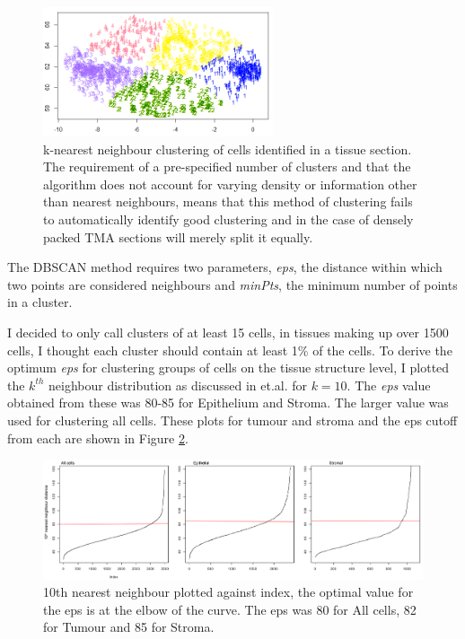 \begin{figure}
    \centering
    \includegraphics{Chapter3/Figs/knn_example_2.png}
    \caption[k-nearest neighbour clustering of cells]{k-nearest neighbour clustering of cells identified in a tissue section. The requirement of a pre-specified number of clusters and that the algorithm does not account for varying density or information other than nearest neighbours, means that this method of clustering fails to automatically identify good clustering and in the case of densely packed TMA sections will merely split it equally.}
    \label{fig:clust_bad}
\end{figure}


The DBSCAN method requires two parameters, \textit{eps}, the distance within which two points are considered neighbours and \textit{minPts}, the minimum number of points in a cluster.

I decided to only call clusters of at least 15 cells, in tissues making up over 1500 cells, I thought each cluster should contain at least 1\% of the cells. To derive the optimum \textit{eps} for clustering groups of cells on the tissue structure level, I plotted the $k^{th}$ neighbour distribution as discussed in et.al. for $k=10$. The \textit{eps} value obtained from these was 80-85 for Epithelium and Stroma. The larger value was used for clustering all cells. These plots for tumour and stroma and the eps cutoff from each are shown in Figure \ref{fig:eps}.

\begin{figure}
    \centering
    \includegraphics[width=\textwidth]{Chapter3/Figs/Thesis-11.png}
    \caption{10th nearest neighbour plotted against index, the optimal value for the eps is at the elbow of the curve. The eps was 80 for All cells, 82 for Tumour and 85 for Stroma.}
    \label{fig:eps}
\end{figure}

